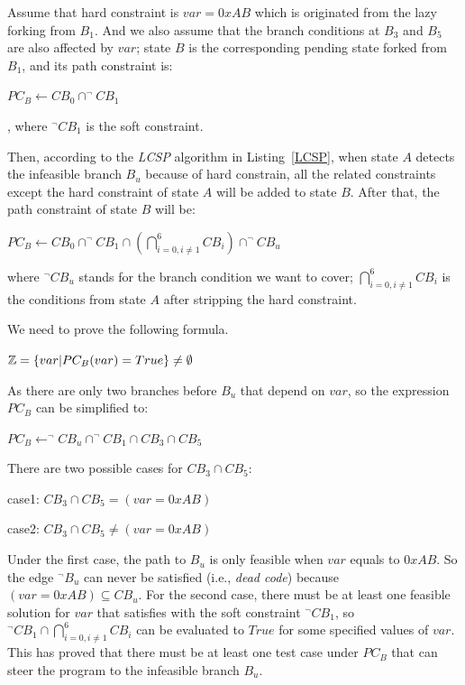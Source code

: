  Assume that hard constraint is $var=0xAB$ which is originated from the lazy forking from $B_1$. And we also assume that the branch conditions at $B_3$ and $B_5$ are also affected by $var$; state $B$ is the corresponding pending state forked from $B_1$, and its path constraint is:
\begin{center}
$PC_B\leftarrow\displaystyle CB_0 \cap ^\neg CB_1$
\end{center}
, where $^\neg CB_1$ is the soft constraint.

Then, according to the \textit{LCSP} algorithm in Listing~\ref{LCSP}, when state $A$ detects the infeasible branch $B_u$ because of hard constrain, all the related constraints except the hard constraint of state $A$ will be added to state $B$. After that, the path constraint of state $B$ will be:

\begin{center}
$PC_B\leftarrow\displaystyle CB_0 \cap ^\neg CB_1 \cap (\bigcap\limits_{i=0,i \neq 1}^{6} CB_i) \cap ^\neg CB_u$
\end{center}
where $^\neg CB_u $ stands for the branch condition we want to cover;  $\bigcap_{i=0,i \neq 1}^{6} CB_i$ is the conditions from state $A$ after stripping the hard constraint.

We need to prove the following formula.

\begin{center}
$\mathbb{Z}=\{var\arrowvert PC_B(var) = True\} \neq \emptyset$
\end{center}

As there are only two branches before $B_u$ that depend on $var$, so the expression $PC_B$ can be simplified to:
\begin{center}
$PC_B\leftarrow^\neg CB_u \cap ^\neg CB_1 \cap CB_3 \cap CB_5$
\end{center}

There are two possible cases for $CB_3 \cap CB_5$:
\begin{center}
case1: $CB_3 \cap CB_5 = (var = 0xAB)$

case2: $CB_3 \cap CB_5 \neq (var = 0xAB)$
\end{center}

Under the first case, the path to $B_u$ is only feasible when $var$ equals to $0xAB$. So the edge $^\neg B_u$ can never be satisfied (i.e., \emph{dead code}) because $(var = 0xAB) \subseteq CB_u$. For the second case, there must be at least one feasible solution for $var$ that satisfies with the soft constraint $^\neg CB_1$, so $^\neg CB_1 \cap \bigcap_{i=0,i \neq 1}^{6} CB_i$ can be evaluated to $True$ for some specified values of $var$. This has proved that there must be at least one test case under $PC_B$ that can steer the program to the infeasible branch $B_u$.

